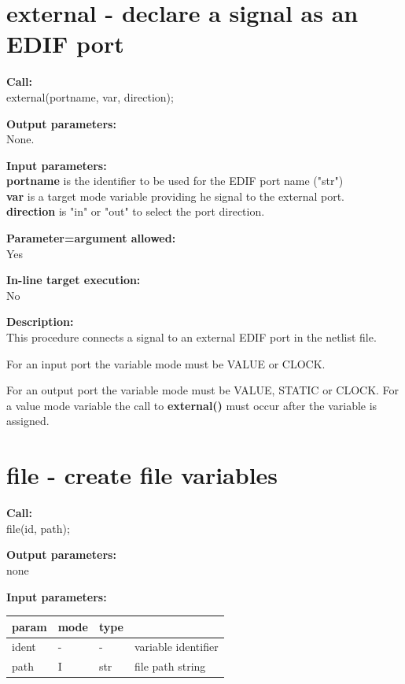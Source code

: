     \section{external - declare a signal as an EDIF port}\label{sec:ipexternal}
        
        {\bf Call:} \\
        external(portname, var, direction);
        
        {\bf Output parameters:} \\
        None.
        
        {\bf Input parameters:} \\
        {\bf portname} is the identifier to be used for the EDIF port name ("str")\\
        {\bf var} is a target mode variable providing he signal to the external port.\\
        {\bf direction} is "in" or "out" to select the port direction.
        
        {\bf Parameter=argument allowed:} \\
        Yes
        
        {\bf In-line target execution:} \\
        No
        
        {\bf Description:} \\
        This procedure connects a signal to an external EDIF port in the netlist file.
        
        For an input port the variable mode must be VALUE or CLOCK.
        
        For an output port the variable mode must be VALUE, STATIC or CLOCK.
        For a value mode variable the call to {\bf external()} must occur
        after the variable is assigned.
        


    \section{file - create file variables}\label{sec:ipfile}
        
        {\bf Call:} \\
        file(id, path);
        
        {\bf Output parameters:} \\
        none
        
        {\bf Input parameters:} \\
        \begin{tabular}{| l | l | l | l |}
        \hline
        param  & mode & type  & \\
        \hline \hline
        ident & - & -   & variable identifier \\ \hline
        path  & I & str & file path string    \\ \hline
        \end{tabular}
        
